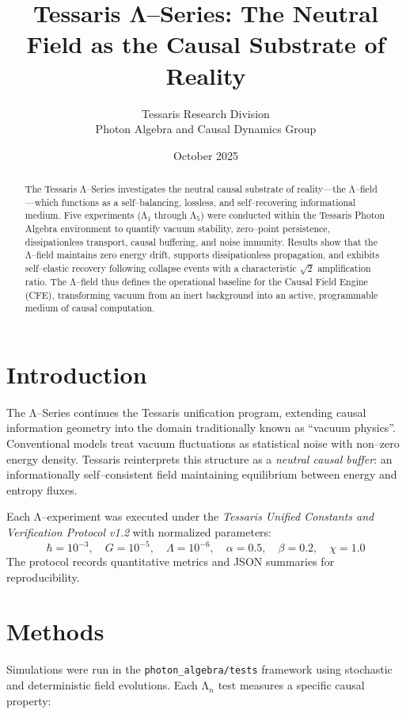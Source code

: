 \documentclass[12pt]{article}
\title{\textbf{Tessaris Λ--Series: The Neutral Field as the Causal Substrate of Reality}}
\author{Tessaris Research Division \\ Photon Algebra and Causal Dynamics Group}
\date{October 2025}
\begin{document}
\maketitle

\begin{abstract}
The Tessaris Λ--Series investigates the neutral causal substrate of reality---the Λ--field---which functions as a self--balancing, lossless, and self--recovering informational medium. 
Five experiments (Λ$_1$ through Λ$_5$) were conducted within the Tessaris Photon Algebra environment to quantify vacuum stability, zero--point persistence, dissipationless transport, causal buffering, and noise immunity. 
Results show that the Λ--field maintains zero energy drift, supports dissipationless propagation, and exhibits self--elastic recovery following collapse events with a characteristic $\sqrt{2}$ amplification ratio. 
The Λ--field thus defines the operational baseline for the Causal Field Engine (CFE), transforming vacuum from an inert background into an active, programmable medium of causal computation.
\end{abstract}

\section{Introduction}
The Λ--Series continues the Tessaris unification program, extending causal information geometry into the domain traditionally known as ``vacuum physics''. 
Conventional models treat vacuum fluctuations as statistical noise with non--zero energy density. 
Tessaris reinterprets this structure as a \emph{neutral causal buffer}: an informationally self--consistent field maintaining equilibrium between energy and entropy fluxes.

Each Λ--experiment was executed under the \textit{Tessaris Unified Constants and Verification Protocol v1.2} with normalized parameters:
\[
\hbar = 10^{-3}, \quad G = 10^{-5}, \quad \Lambda = 10^{-6}, \quad \alpha = 0.5, \quad \beta = 0.2, \quad \chi = 1.0
\]
The protocol records quantitative metrics and JSON summaries for reproducibility.

\section{Methods}
Simulations were run in the \texttt{photon\_algebra/tests} framework using stochastic and deterministic field evolutions. 
Each Λ$_n$ test measures a specific causal property:
\end{document}
